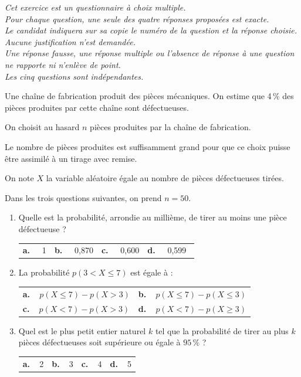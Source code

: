 \medskip

\emph{Cet exercice est un questionnaire à choix multiple.\\
Pour chaque question, une seule des quatre réponses proposées est exacte.\\
Le candidat indiquera sur sa copie le numéro de la question et la réponse choisie.\\
Aucune justification n'est demandée.\\
Une réponse fausse, une réponse multiple ou l'absence de réponse à une question ne rapporte ni n'enlève de point.\\
Les cinq questions sont indépendantes.}

\medskip

Une chaîne de fabrication produit des pièces mécaniques. On estime que 4\,\% des pièces produites par cette chaîne sont défectueuses.

On choisit au hasard $n$ pièces produites par la chaîne de fabrication. 

Le nombre de pièces produites est suffisamment grand pour que ce choix puisse être assimilé à un tirage avec remise. 

On note $X$ la variable aléatoire égale au nombre de pièces défectueuses tirées.

Dans les trois questions suivantes, on prend $n = 50$.

\medskip

\begin{enumerate}
\item Quelle est la probabilité, arrondie au millième, de tirer au moins une pièce défectueuse ?

\begin{center}
\begin{tabularx}{\linewidth}{*{4}X}
\textbf{a.~~} 1&\textbf{b.~~} 0,870&\textbf{c.~~} 0,600&\textbf{d.~~} 0,599\
\end{tabularx}
\end{center}

\item La probabilité $p(3 < X \leqslant 7)$ est égale à :
\begin{center}
\begin{tabularx}{\linewidth}{*{2}X}
\textbf{a.~~}$p(X \leqslant 7) - p(X > 3)$&
\textbf{b.~~}$p(X \leqslant 7) - p(X \leqslant 3)$\\
\textbf{c.~~}$p(X < 7)- p(X > 3)$&
\textbf{d.~~}$p(X < 7) - p(X \geqslant 3)$
\end{tabularx}
\end{center}
\item Quel est le plus petit entier naturel $k$ tel que la probabilité de tirer au plus $k$ pièces défectueuses soit supérieure ou égale à $95\,\%$ ?

\begin{center}
\begin{tabularx}{\linewidth}{*{4}X}
\textbf{a.~~}2&\textbf{b.~~}3&\textbf{c.~~}4&\textbf{d.~~}5
\end{tabularx}
\end{center}
\end{enumerate}


